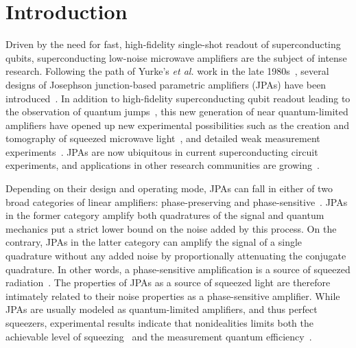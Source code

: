 \documentclass[pra,twocolumn,superscriptaddress]{revtex4-1}
\begin{document}
\maketitle

\section{Introduction}
Driven by the need for fast, high-fidelity single-shot readout of superconducting qubits,  superconducting low-noise microwave amplifiers are the subject of intense research.
% 
Following the path of Yurke's \textit{et al.} work in the late 1980s~\cite{Yurke:1988kb,Yurke:1989fk,Yurke:1989kx}, several designs of Josephson junction-based parametric amplifiers (JPAs) have been introduced~\cite{Castellanos-Beltran:2007ys,Yamamoto:2008dp,Bergeal:2010uq,Hatridge:2011qf,Mutus:2013yu,Eichler:2013fk,Mutus:2014ve,Eichler:2014uq}. 
In addition to high-fidelity superconducting qubit readout leading to the observation of quantum jumps~\cite{Jeffrey:2014uq,Vijay:2011ve},
this new generation of near quantum-limited amplifiers have opened up new experimental possibilities such as
the creation and tomography of squeezed microwave light~\cite{Castellanos-Beltran:2008vn,Mallet:2011fk,Fedorov:2016}, and detailed weak measurement experiments~\cite{Murch:2013uq,Weber:2014fv,Campagne-Ibarcq:2014qf}.
JPAs are now ubiquitous in current superconducting circuit experiments, and applications in other research communities are growing~\cite{Stehlik:2015nr,Virally:2015fj,Simoneau2016,Goetz:2017}.

Depending on their design and operating mode, JPAs can fall in either of two broad categories of linear amplifiers: phase-preserving and phase-sensitive~\cite{caves:1982a,Roy:2016fk}. JPAs in the former category amplify both quadratures of the signal and quantum mechanics put a strict lower bound on the noise added by this process. On the contrary, JPAs in the latter category can amplify the signal of a single quadrature without any added noise by proportionally attenuating the conjugate quadrature. In other words, a phase-sensitive amplification is a source of squeezed radiation~\cite{Walls:2008fk,Gardiner:2004fk}. The properties of JPAs as a source of squeezed light are therefore intimately related to their noise properties as a phase-sensitive amplifier. While JPAs are usually modeled as quantum-limited amplifiers, and thus perfect squeezers, experimental results indicate that nonidealities limits both the achievable level of squeezing~\cite{Zhong:2013vn,Murch:2013kx,Bienfait:2016yq} and the measurement quantum efficiency~\cite{Murch:2013uq,Murch:2013kx,Vijay:2012uq,weberThesis}.
\end{document}
